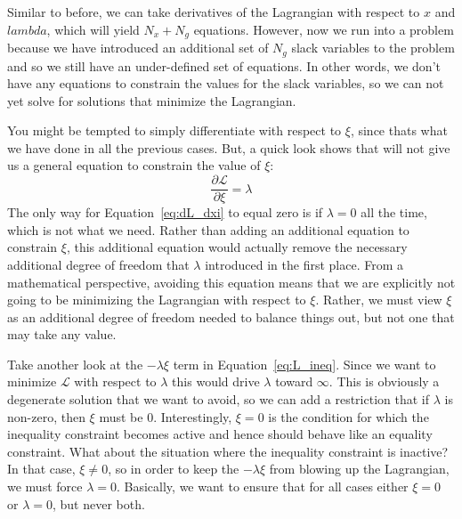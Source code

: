 \documentclass[conf]{new-aiaa}
\begin{document}
        Similar to before, we can take derivatives of the Lagrangian with respect to $x$ and $lambda$, which will yield 
        $N_x+N_g$ equations. 
        However, now we run into a problem because we have introduced an additional set of $N_g$ slack variables to the problem and so we still have an under-defined set of equations. 
        In other words, we don't have any equations to constrain the values for the slack variables, so we can not yet solve for solutions that minimize the Lagrangian. 

        You might be tempted to simply differentiate with respect to $\xi$, since thats what we have done in all the previous cases. 
        But, a quick look shows that will not give us a general equation to constrain the value of $\xi$:
        \begin{equation}
            \frac{\partial \mathcal{L}}{\partial \xi} = \lambda \label{eq:dL_dxi}
        \end{equation}
        The only way for Equation~\eqref{eq:dL_dxi} to equal zero is if $\lambda=0$ all the time, which is not what we need. 
        Rather than adding an additional equation to constrain $\xi$, this additional equation would actually remove the necessary additional degree of freedom that $\lambda$ introduced in the first place. 
        From a mathematical perspective, avoiding this equation means that we are explicitly not going to be minimizing the Lagrangian with respect to $\xi$. 
        Rather, we must view $\xi$ as an additional degree of freedom needed to balance things out, but not one that may take any value. 


        Take another look at the $-\lambda \xi$ term in Equation~\eqref{eq:L_ineq}. 
        Since we want to minimize $\mathcal{L}$ with respect to $\lambda$ this would drive $\lambda$ toward $\infty$. 
        This is obviously a degenerate solution that we want to avoid, so we can add a restriction that if $\lambda$ is non-zero, then 
        $\xi$ must be 0. 
        Interestingly, $\xi=0$ is the condition for which the inequality constraint becomes active and hence should behave like an equality constraint. 
        What about the situation where the inequality constraint is inactive? 
        In that case, $\xi \ne 0$, so in order to keep the $-\lambda \xi$ from blowing up the Lagrangian, we must force $\lambda=0$. 
        Basically, we want to ensure that for all cases either $\xi=0$ or $\lambda=0$, but never both. 
\end{document}
